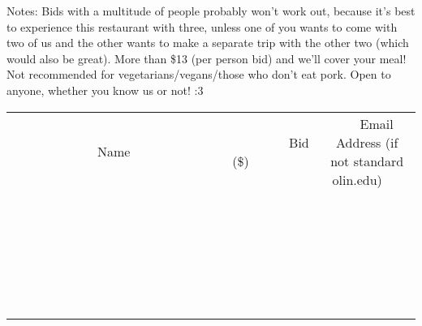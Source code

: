 \documentclass[11pt]{article}
\begin{document}
Notes: Bids with a multitude of people probably won't work out, because it's best to experience this restaurant with three, unless one of you wants to come with two of us and the other wants to make a separate trip with the other two (which would also be great). More than \$13 (per person bid) and we'll cover your meal! Not recommended for vegetarians/vegans/those who don't eat pork. Open to anyone, whether you know us or not! :3
\\[6ex]
\begin{tabular}{c c c}
~~~~~~~~~~~~~Name~~~~~~~~~~~~~ & ~~~~~~~~~Bid (\$)~~~~~~~~~  & ~~~Email Address (if not standard olin.edu)~~~\\
 & & \\
\hline
 & & \\
\hline
 & & \\
\hline
 & & \\
\hline
 & & \\
\hline
 & & \\
\hline
 & & \\
\hline
 & & \\
\hline
 & & \\
\hline
 & & \\
\hline
 & & \\
\hline
 & & \\
\hline
 & & \\
\hline
 & & \\
\hline
 & & \\
\hline
 & & \\
\hline
 & & \\
\hline
 & & \\
\hline
 & & \\
\hline
 & & \\
\hline
 & & \\
\hline
 & & \\
\hline
 & & \\
\hline
 & & \\
\hline
 & & \\
\hline
 & & \\
\hline
\end{tabular}
\newpage
\end{document}
